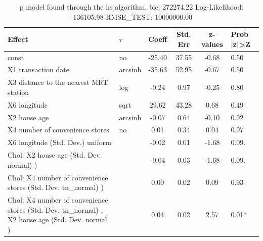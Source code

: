 \begin{table}
	\caption{p model found through the hs algorithm. bic: 272274.22 Log-Likelihood: -136105.98 RMSE_TEST: 10000000.00}
	\begin{center}
		\begin{tabular}{|l|l|c|c|c|l|}
			\hline
			Effect & $\tau$ & Coeff & Std. Err & z-values & Prob |z|>Z \\
			\hline
			const & no & -25.40 & 37.55 & -0.68 & 0.50 \\
			\hline
			X1 transaction date & arcsinh & -35.63 & 52.95 & -0.67 & 0.50 \\
			\hline
			X3 distance to the nearest MRT station & log & -0.24 & 0.97 & -0.25 & 0.80 \\
			\hline
			X6 longitude & sqrt & 29.62 & 43.28 & 0.68 & 0.49 \\
			\hline
			X2 house age & arcsinh & -0.07 & 0.64 & -0.10 & 0.92 \\
			\hline
			X4 number of convenience stores & no & 0.01 & 0.34 & 0.04 & 0.97 \\
			\hline
			X6 longitude (Std. Dev.) uniform &  & -0.02 & 0.01 & -1.68 & 0.09. \\
			\hline
			 Chol: X2 house age (Std. Dev. normal) ) &  & -0.04 & 0.03 & -1.68 & 0.09. \\
			\hline
			 Chol: X4 number of convenience stores (Std. Dev. tn_normal) ) &  & 0.00 & 0.02 & 0.09 & 0.93 \\
			\hline
			 Chol: X4 number of convenience stores (Std. Dev. tn_normal) . X2 house age (Std. Dev.   normal ) &  & 0.04 & 0.02 & 2.57 & 0.01* \\
			\hline
		\end{tabular}
	\end{center}
\end{table}